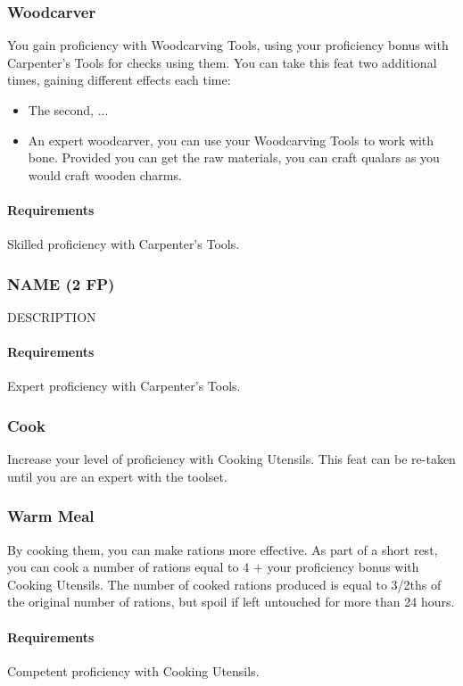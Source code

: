 \subsubsection{Woodcarver} \label{feat::woodcarver}
    You gain proficiency with Woodcarving Tools, using your proficiency bonus with Carpenter's Tools for checks using them.
    You can take this feat two additional times, gaining different effects each time:
    \begin{itemize}
        \item The second, ...
        \item An expert woodcarver, you can use your Woodcarving Tools to work with bone.
        Provided you can get the raw materials, you can craft qualars as you would craft wooden charms.
    \end{itemize}
    \paragraph{Requirements} Skilled proficiency with Carpenter's Tools.
\subsubsection{NAME (2 FP)} \label{feat::name}
    DESCRIPTION
    \paragraph{Requirements} Expert proficiency with Carpenter's Tools.
\subsubsection{Cook} \label{feat::cook}
    Increase your level of proficiency with Cooking Utensils.
    This feat can be re-taken until you are an expert with the toolset.
\subsubsection{Warm Meal} \label{feat::warmmeal}
    By cooking them, you can make rations more effective.
    As part of a short rest, you can cook a number of rations equal to 4 + your proficiency bonus with Cooking Utensils.
    The number of cooked rations produced is equal to 3/2ths of the original number of rations, but spoil if left untouched for more than 24 hours.
    \paragraph{Requirements} Competent proficiency with Cooking Utensils.
